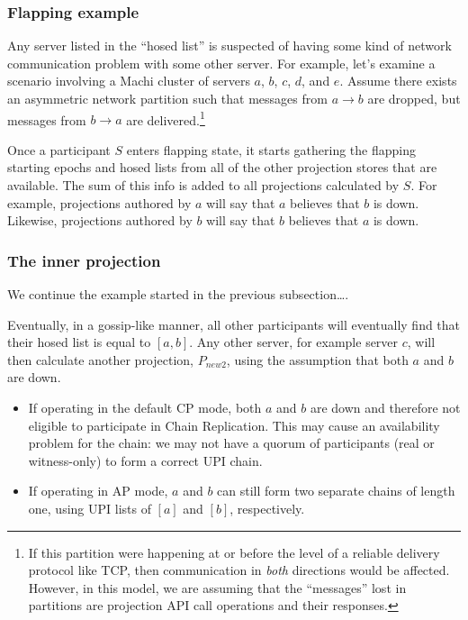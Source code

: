 \documentclass[preprint,10pt]{sigplanconf}
\begin{document}
\subsubsection{Flapping example}
\label{ssec:flapping-example}

Any server listed in the ``hosed list'' is suspected of having some
kind of network communication problem with some other server.  For
example, let's examine a scenario involving a Machi cluster of servers
$a$, $b$, $c$, $d$, and $e$.  Assume there exists an asymmetric network
partition such that messages from $a \rightarrow b$ are dropped, but
messages from $b \rightarrow a$ are delivered.\footnote{If this
  partition were happening at or before the level of a reliable
  delivery protocol like TCP, then communication in {\em both}
  directions would be affected.  However, in this model, we are
  assuming that the ``messages'' lost in partitions are projection API
  call operations and their responses.}

Once a participant $S$ enters flapping state, it starts gathering the
flapping starting epochs and hosed lists from all of the other
projection stores that are available.  The sum of this info is added
to all projections calculated by $S$.
For example, projections authored by $a$ will say that $a$ believes
that $b$ is down. 
Likewise, projections authored by $b$ will say that $b$ believes
that $a$ is down. 

\subsubsection{The inner projection}
\label{ssec:inner-projection}

We continue the example started in the previous subsection\ldots.

Eventually, in a gossip-like manner, all other participants will
eventually find that their hosed list is equal to $[a,b]$.  Any other
server, for example server $c$, will then calculate another
projection, $P_{new2}$, using the assumption that both $a$ and $b$
are down.

\begin{itemize}
\item If operating in the default CP mode, both $a$ and $b$ are down
  and therefore not eligible to participate in Chain Replication.
  This may cause an availability problem for the chain: we may not
  have a quorum of participants (real or witness-only) to form a
  correct UPI chain.
\item If operating in AP mode, $a$ and $b$ can still form two separate
  chains of length one, using UPI lists of $[a]$ and $[b]$, respectively. 
\end{itemize}
\end{document}
